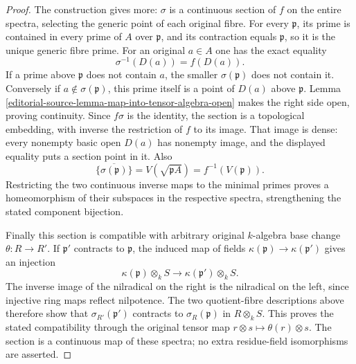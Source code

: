 \begin{proof}
The construction gives more:
$\sigma$ is a continuous section
of $f$ on the entire spectra,
selecting the generic point
of each original fibre.
For every $\mathfrak p$, its
prime is contained in every
prime of $A$ over $\mathfrak p$,
and its contraction equals
$\mathfrak p$, so it is the
unique generic fibre prime.
For an original $a\in A$ one
has the exact equality
$$
\sigma^{-1}(D(a))=f(D(a)).
$$
If a prime above $\mathfrak p$
does not contain $a$, the
smaller $\sigma(\mathfrak p)$
does not contain it. Conversely
if $a\notin\sigma(\mathfrak p)$,
this prime itself is a point
of $D(a)$ above $\mathfrak p$.
Lemma \ref{editorial-source-lemma-map-into-tensor-algebra-open}
makes the right side open,
proving continuity. Since
$f\sigma$ is the identity,
the section is a topological
embedding, with inverse the
restriction of $f$ to its
image. That image is dense:
every nonempty basic open
$D(a)$ has nonempty image,
and the displayed equality
puts a section point in it.
Also
$$
\overline{\{\sigma(\mathfrak p)\}}
=V(\sqrt{\mathfrak pA})
=f^{-1}(V(\mathfrak p)).
$$
Restricting the two continuous
inverse maps to the minimal
primes proves a homeomorphism
of their subspaces in the
respective spectra, strengthening
the stated component bijection.

Finally this section is
compatible with arbitrary
original $k$-algebra base change
$\theta:R\to R'$. If $\mathfrak p'$
contracts to $\mathfrak p$,
the induced map of fields
$\kappa(\mathfrak p)\to\kappa(\mathfrak p')$
gives an injection
$$
\kappa(\mathfrak p)\otimes_k S
\longrightarrow\kappa(\mathfrak p')\otimes_k S.
$$
The inverse image of the
nilradical on the right is
the nilradical on the left,
since injective ring maps
reflect nilpotence. The two
quotient-fibre descriptions
above therefore show that
$\sigma_{R'}(\mathfrak p')$
contracts to
$\sigma_R(\mathfrak p)$ in
$R\otimes_k S$. This proves
the stated compatibility
through the original tensor
map $r\otimes s\mapsto\theta(r)\otimes s$.
The section is a continuous
map of these spectra; no
extra residue-field
isomorphisms are asserted.
\end{proof}